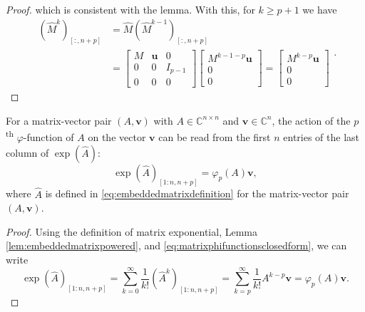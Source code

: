 \begin{proof}
    which is consistent with the lemma.
    With this, for $k \ge p+1$ we have
    \begin{equation*}
        \begin{aligned}
            (\hat{M}^k)_{[:, n+p]} & = \hat{M} (\hat{M}^{k-1})_{[:, n+p]} \\
            & =
            \begin{bmatrix} M & \mathbf{u} & 0\\ 0 & 0 & I_{p-1}\\ 0 & 0 & 0 \end{bmatrix}
            \begin{bmatrix} M^{k-1-p} \mathbf{u} \\ 0 \\ 0 \end{bmatrix}
            =
            \begin{bmatrix} M^{k-p} \mathbf{u} \\ 0 \\ 0 \end{bmatrix}
        \end{aligned}.
    \end{equation*}
\end{proof}

\begin{corollary}
    \label{cor:embeddedmatrixexponential}
    For a matrix-vector pair $(A, \mathbf{v})$ with $A \in \mathbb{C}^{n \times n}$ and
    $\mathbf{v} \in \mathbb{C}^n$, the action of the $p$\textsuperscript{th} $\varphi$-function
    of $A$ on the vector $\mathbf{v}$ can be read from the first $n$ entries of the last
    column of $\exp(\hat{A})$:
    \begin{equation*}
        \exp(\hat{A})_{[1 : n, n+p]} = \varphi_p(A) \mathbf{v},
    \end{equation*}
    where $\hat{A}$ is defined in \eqref{eq:embeddedmatrixdefinition} for the matrix-vector
    pair $(A, \mathbf{v})$.
\end{corollary}
\begin{proof}
    Using the definition of matrix exponential, Lemma \ref{lem:embeddedmatrixpowered},
    and \eqref{eq:matrixphifunctionsclosedform}, we can write
    \begin{equation*}
        \exp(\hat{A})_{[1 : n, n+p]}
        = \sum_{k=0}^{\infty}{\frac{1}{k!} (\hat{A}^k)_{[1 : n, n+p]}}
        = \sum_{k=p}^{\infty}{\frac{1}{k!} A^{k-p} \mathbf{v}}
        = \varphi_p(A) \mathbf{v}.
    \end{equation*}
\end{proof}

